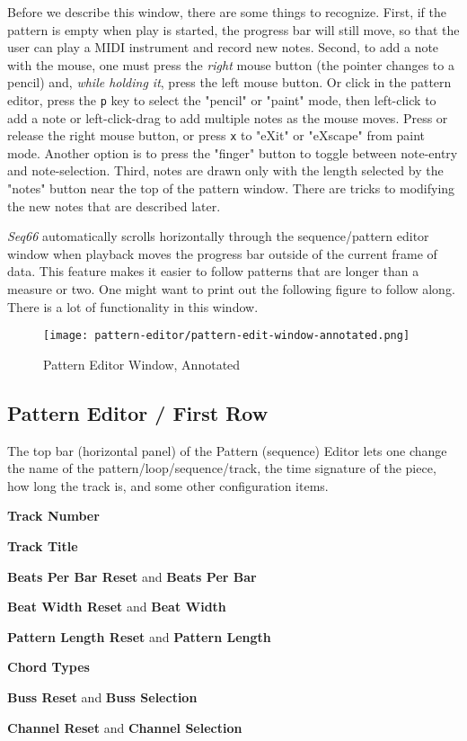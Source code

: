    Before we describe this window, there are some things to recognize.
   First, if the pattern is empty when play is started, the progress bar will
   still move, so that the user can play a MIDI instrument and record new notes.
   Second, to add a note with the mouse, one must press the \textsl{right}
   mouse button (the pointer changes to a pencil) and,
   \textsl{while holding it}, press the left mouse button.
   Or click in the pattern editor, press the
   \texttt{p} key to select the "pencil" or "paint" mode, then
   left-click to add a note or
   left-click-drag to add multiple notes as the mouse moves.
   Press or release the right mouse button, or press
   \texttt{x} to "eXit" or "eXscape" from paint mode.
   Another option is to press the "finger" button to toggle between note-entry
   and note-selection.
   Third, notes are drawn only with the length selected by the "notes" button
   near the top of the pattern window.  There are tricks to
   modifying the new notes that are described later.

   \textsl{Seq66} automatically scrolls
   horizontally through the sequence/pattern editor window when
   playback moves the progress bar outside of the current frame of data.  This
   feature makes it easier to follow patterns that are longer than a measure or
   two.
   One might want to print out the following figure to follow along.  There is
   a lot of functionality in this window.

\begin{figure}[H]
   \centering 
   \texttt{[image: pattern-editor/pattern-edit-window-annotated.png]}
   \caption{Pattern Editor Window, Annotated}
   \label{fig:pattern_editor_window_annotated}
\end{figure}

\subsection{Pattern Editor / First Row}
\label{subsec:pattern_editor_first_row}

   The top bar (horizontal panel) of the Pattern (sequence) Editor
   lets one change the name of
   the pattern/loop/sequence/track, the time signature of the piece, how long
   the track is, and some other configuration items.

   \begin{enumber}
      \item \textbf{Track Number}
      \item \textbf{Track Title}
      \item \textbf{Beats Per Bar Reset} and \textbf{Beats Per Bar}
      \item \textbf{Beat Width Reset} and \textbf{Beat Width}
      \item \textbf{Pattern Length Reset} and \textbf{Pattern Length}
      \item \textbf{Chord Types}
      \item \textbf{Buss Reset} and \textbf{Buss Selection}
      \item \textbf{Channel Reset} and \textbf{Channel Selection}
   \end{enumber}

